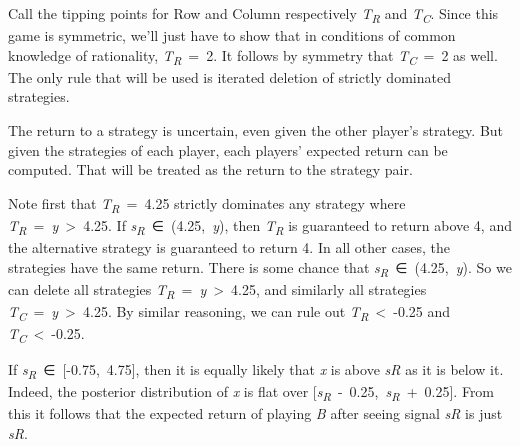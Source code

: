 \documentclass[
  10pt,
  letterpaper,
  twoside]{scrbook}
\begin{document}
Call the tipping points for Row and Column respectively
\emph{T\textsubscript{R}} and \emph{T\textsubscript{C}}. Since this game
is symmetric, we'll just have to show that in conditions of common
knowledge of rationality, \emph{T\textsubscript{R}}~=~2. It follows by
symmetry that \emph{T\textsubscript{C}}~=~2 as well. The only rule that
will be used is iterated deletion of strictly dominated strategies.

The return to a strategy is uncertain, even given the other player's
strategy. But given the strategies of each player, each players'
expected return can be computed. That will be treated as the return to
the strategy pair.

Note first that \emph{T\textsubscript{R}}~=~4.25 strictly dominates any
strategy where \emph{T\textsubscript{R}}~=~\emph{y}~\textgreater~4.25.
If \emph{s\textsubscript{R}}~∈~(4.25,~\emph{y}), then
\emph{T\textsubscript{R}} is guaranteed to return above 4, and the
alternative strategy is guaranteed to return 4. In all other cases, the
strategies have the same return. There is some chance that
\emph{s\textsubscript{R}}~∈~(4.25,~\emph{y}). So we can delete all
strategies \emph{T\textsubscript{R}}~=~\emph{y}~\textgreater~4.25, and
similarly all strategies
\emph{T\textsubscript{C}}~=~\emph{y}~\textgreater~4.25. By similar
reasoning, we can rule out \emph{T\textsubscript{R}}~\textless~-0.25 and
\emph{T\textsubscript{C}}~\textless~-0.25.

If \emph{s\textsubscript{R}}~∈~{[}-0.75,~4.75{]}, then it is equally
likely that \emph{x} is above \emph{sR} as it is below it. Indeed, the
posterior distribution of \emph{x} is flat over
{[}\emph{s\textsubscript{R}}~-~0.25,~\emph{s\textsubscript{R}}~+~0.25{]}.
From this it follows that the expected return of playing \emph{B} after
seeing signal \emph{sR} is just \emph{sR}.
\end{document}
